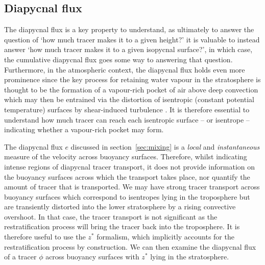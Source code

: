 \documentclass[a4paper]{article}
\begin{document}
\subsection{Diapycnal flux}

\label{sec:diapyc}
The diapycnal flux is a key property to understand, as ultimately to answer the question of `how much tracer
makes it to a given height?' it is valuable to instead answer `how much tracer makes it to a given isopycnal
surface?', in which case, the cumulative diapycnal flux goes some way to answering that question. Furthermore,
in the atmospheric context, the diapycnal flux holds even more prominence since the key process for retaining
water vapour in the stratosphere is thought to be the formation of a vapour-rich pocket of air above deep
convection which may then be entrained via the distortion of isentropic (constant potential temperature)
surfaces by shear-induced turbulence \citep{dauhut2018}. It is therefore essential to understand how much
tracer can reach each isentropic surface -- or isentrope -- indicating whether a vapour-rich pocket may form.

The diapycnal flux $e$ discussed in section~\ref{sec:mixing} is a \emph{local} and \emph{instantaneous}
measure of the velocity across buoyancy surfaces. Therefore, whilst indicating intense regions of diapycnal
tracer transport, it does not provide information on the buoyancy surfaces across which the transport takes
place, nor quantify the amount of tracer that is transported. We may have strong tracer transport across
buoyancy surfaces which correspond to isentropes lying in the troposphere but are transiently distorted into
the lower stratosphere by a rising convective overshoot. In that case, the tracer transport is not significant
as the restratification process will bring the tracer back into the troposphere. It is therefore useful to use
the $z^*$ formalism, which implicitly accounts for the restratification process by construction. We can then
examine the diapycnal flux of a tracer $\phi$ across buoyancy surfaces with $z^*$ lying in the stratosphere.
\end{document}
